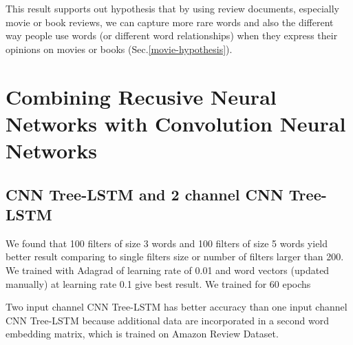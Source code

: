 This result supports out hypothesis that by using review documents, especially movie or book reviews, we can capture more rare words and also the different way people use words (or different word relationships) when they express their opinions on movies or books (Sec.\ref{movie-hypothesis}).
 
\section{Combining Recusive Neural Networks with Convolution Neural Networks}
\subsection{CNN Tree-LSTM and 2 channel CNN Tree-LSTM}
We found that 100 filters of size 3 words and 100 filters of size 5 words yield better result comparing to single filters size or number of filters larger than 200. We trained with Adagrad of learning rate of 0.01 and word vectors (updated manually) at learning rate 0.1 give best result. We trained for 60 epochs

Two input channel CNN Tree-LSTM has better accuracy than one input channel CNN Tree-LSTM because additional data are incorporated in a second word embedding matrix, which is trained on Amazon Review Dataset.







